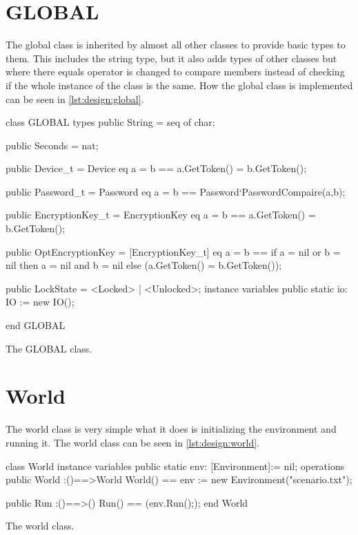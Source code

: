 \section{GLOBAL}
The global class is inherited by almost all other classes to provide basic
types to them. This includes the string type, but it also adds types of other
classes but where there equals operator is changed to compare members instead
of checking if the whole instance of the class is the same. How the global
class is implemented can be seen in \cref{lst:design:global}.
\begin{listing}[H]
    \begin{vdm_al}
class GLOBAL
types
public String = seq of char;

public Seconds = nat;

public Device_t = Device eq a = b == a.GetToken() = b.GetToken();

public Password_t = Password eq a = b == Password`PasswordCompaire(a,b);

public EncryptionKey_t = EncryptionKey eq a = b == a.GetToken() = b.GetToken();

public OptEncryptionKey = [EncryptionKey_t] eq a = b == if a = nil or b = nil
then a = nil and b = nil else (a.GetToken() = b.GetToken());

public LockState = <Locked> | <Unlocked>; instance variables public static io:
IO := new IO();

end GLOBAL

    \end{vdm_al}
    \caption{The GLOBAL class.}
    \label{lst:design:global}
\end{listing}

\section{World}
The world class is very simple what it does is initializing the environment and running it. The world class can be seen in \cref{lst:design:world}.

\begin{listing}[H]
    \begin{vdm_al}
class World
instance variables
    public static env: [Environment]:= nil;
operations
    public World :()==>World
    World() ==
    env := new Environment("scenario.txt");

    public Run :()==>()
    Run() ==
    (env.Run(););
end World
    

    \end{vdm_al}
    \caption{The world class.}
    \label{lst:design:world}
\end{listing}

